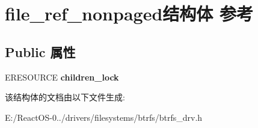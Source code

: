 \hypertarget{structfile__ref__nonpaged}{}\section{file\+\_\+ref\+\_\+nonpaged结构体 参考}
\label{structfile__ref__nonpaged}
\subsection*{Public 属性}
\begin{DoxyCompactItemize}
\item 
\mbox{\label{structfile__ref__nonpaged_a5eaa1b99ca2a35320048cb2143e3bcb8}} 
E\+R\+E\+S\+O\+U\+R\+CE {\bfseries children\+\_\+lock}
\end{DoxyCompactItemize}


该结构体的文档由以下文件生成\+:\begin{DoxyCompactItemize}
\item 
E\+:/\+React\+O\+S-\/0../drivers/filesystems/btrfs/btrfs\+\_\+drv.\+h\end{DoxyCompactItemize}
